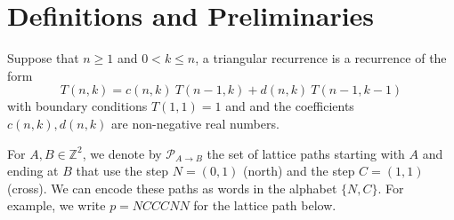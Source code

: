 \documentclass{article}
\newcommand{\lp}{\mathcal{P}}
\DeclareMathOperator{\bl}{bl}
\theoremstyle{definition}
\numberwithin{equation}{section}
\begin{document}



\section{Definitions and Preliminaries}
Suppose that $n\ge 1$ and $0 <k \le n$, a triangular recurrence is a recurrence of the form 
$$T(n,k)=c(n,k)\ T(n-1,k) + d(n,k)\ T(n-1, k-1) $$
with boundary conditions $T(1,1)=1$ and  and the coefficients $c(n,k), d(n,k)$ are non-negative real numbers. 

For $A, B \in \mathbb{Z}^2$, we denote by $\lp_{A \rightarrow B}$ the set of lattice paths starting with $A$ and ending at $B$ that use the step $N=(0,1)$ (north) and the step $C=(1,1)$ (cross). We can encode these paths as words in the alphabet $\{ N, C \}$. For example, we write $p=NCCCNN$ for the lattice path below.

\begin{center}
\end{center}
\end{document}
